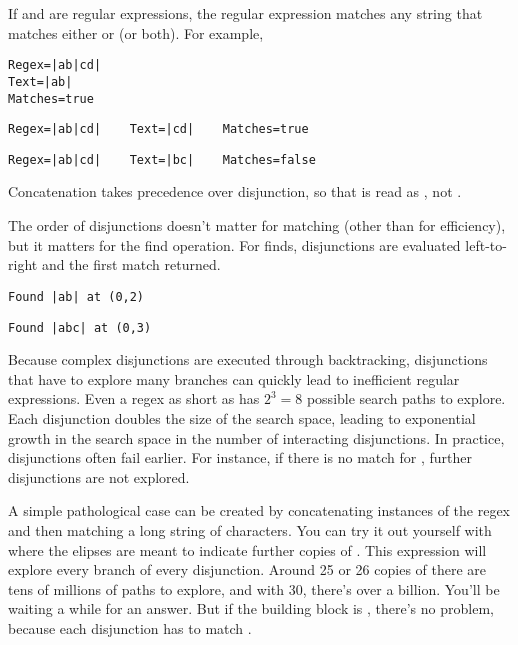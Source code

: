 If  and  are regular expressions, the regular
expression \code{|} matches any string that
matches either  or  (or both).  For example,
%
\begin{verbatim}
Regex=|ab|cd|
Text=|ab|
Matches=true
\end{verbatim}
%
\begin{verbatim}
Regex=|ab|cd|    Text=|cd|    Matches=true
\end{verbatim}
%
\begin{verbatim}
Regex=|ab|cd|    Text=|bc|    Matches=false
\end{verbatim}
%
Concatenation takes precedence over disjunction, so that 
is read as , not .  

The order of disjunctions doesn't matter for matching (other than for
efficiency), but it matters for the find operation.  For finds,
disjunctions are evaluated left-to-right and the first match returned.
%
\begin{verbatim}
Found |ab| at (0,2)
\end{verbatim}
%
\begin{verbatim}
Found |abc| at (0,3)
\end{verbatim}
%

Because complex disjunctions are executed through backtracking,
disjunctions that have to explore many branches can quickly lead to
inefficient regular expressions.  Even a regex as short as
 has $2^3 = 8$ possible search paths to explore.
Each disjunction doubles the size of the search space, leading to
exponential growth in the search space in the number of interacting
disjunctions.  In practice, disjunctions often fail earlier.  For
instance, if there is no match for , further
disjunctions are not explored.  

A simple pathological case can be created by concatenating instances
of the regex  and then matching a long string of 
characters.  You can try it out yourself with
%
%
where the elipses are meant to indicate further copies of .
This expression will explore every branch of every disjunction.
Around 25 or 26 copies of  there are tens of millions of
paths to explore, and with 30, there's over a billion.  You'll be
waiting a while for an answer.  But if the building block is
, there's no problem, because each disjunction has to
match .
%

